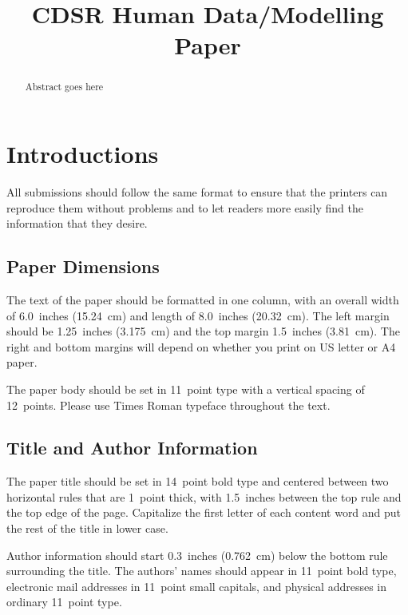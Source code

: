 \documentclass[11pt,letterpaper]{article}
\begin{document}
 

\title{CDSR Human Data/Modelling Paper}
 
\vskip 0.2in
 
\begin{abstract}
Abstract goes here
\end{abstract}

\section{Introductions} 
 
All submissions should follow the same format to ensure that the 
printers can reproduce them without problems and to let readers 
more easily find the information that they desire.

\subsection{Paper Dimensions}

The text of the paper should be formatted in one column, with an
overall width of 6.0~inches (15.24~cm) and length of 8.0~inches 
(20.32~cm). The left margin should be 1.25~inches (3.175~cm) and the 
top margin 1.5~inches (3.81~cm). The right and bottom margins will
depend on whether you print on US letter or A4 paper.

The paper body should be set in 11~point type with a vertical spacing 
of 12~points. Please use Times Roman typeface throughout the text. 

\subsection{Title and Author Information}

The paper title should be set in 14~point bold type and centered
between two horizontal rules that are 1~point thick, with 1.5~inches
between the top rule and the top edge of the page. Capitalize the
first letter of each content word and put the rest of the title in 
lower case.

Author information should start 0.3~inches (0.762~cm) below the bottom
rule surrounding the title. The authors' names should appear in
11~point bold type, electronic mail addresses in 11~point small
capitals, and physical addresses in ordinary 11~point type.
\end{document}
